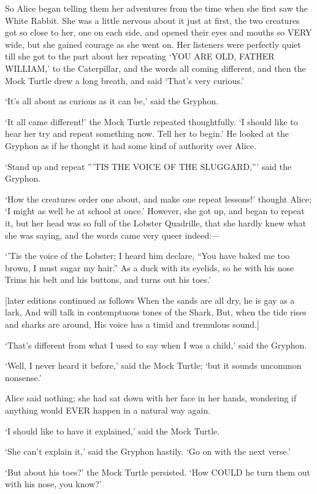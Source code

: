 \documentclass[12pt]{article}
\begin{document}
\begin{Parallel}[p]{}{}
{So Alice began telling them her adventures from the time when she first saw the White Rabbit. She was a little nervous about it just at first, the two creatures got so close to her, one on each side, and opened their eyes and mouths so VERY wide, but she gained courage as she went on. Her listeners were perfectly quiet till she got to the part about her repeating ‘YOU ARE OLD, FATHER WILLIAM,’ to the Caterpillar, and the words all coming different, and then the Mock Turtle drew a long breath, and said ‘That’s very curious.’

‘It’s all about as curious as it can be,’ said the Gryphon.

‘It all came different!’ the Mock Turtle repeated thoughtfully. ‘I should like to hear her try and repeat something now. Tell her to begin.’ He looked at the Gryphon as if he thought it had some kind of authority over Alice.

‘Stand up and repeat ”’TIS THE VOICE OF THE SLUGGARD,”’ said the Gryphon.

‘How the creatures order one about, and make one repeat lessons!’ thought Alice; ‘I might as well be at school at once.’ However, she got up, and began to repeat it, but her head was so full of the Lobster Quadrille, that she hardly knew what she was saying, and the words came very queer indeed:—

  ‘’Tis the voice of the Lobster; I heard him declare,
  “You have baked me too brown, I must sugar my hair.”
  As a duck with its eyelids, so he with his nose
  Trims his belt and his buttons, and turns out his toes.’

       [later editions continued as follows
  When the sands are all dry, he is gay as a lark,
  And will talk in contemptuous tones of the Shark,
  But, when the tide rises and sharks are around,
  His voice has a timid and tremulous sound.]

‘That’s different from what I used to say when I was a child,’ said the Gryphon.

‘Well, I never heard it before,’ said the Mock Turtle; ‘but it sounds uncommon nonsense.’

Alice said nothing; she had sat down with her face in her hands, wondering if anything would EVER happen in a natural way again.

‘I should like to have it explained,’ said the Mock Turtle.

‘She can’t explain it,’ said the Gryphon hastily. ‘Go on with the next verse.’

‘But about his toes?’ the Mock Turtle persisted. ‘How COULD he turn them out with his nose, you know?’

}
\end{Parallel}
\end{document}
